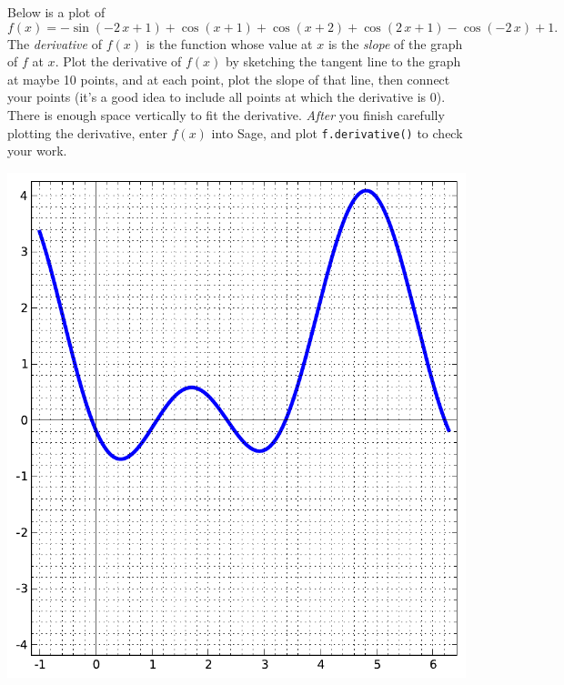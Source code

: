 Below is a plot of $$f(x)=-\sin\left(-2 \, x + 1\right) + \cos\left(x + 1\right) + \cos\left(x + 2\right) + \cos\left(2 \, x + 1\right) - \cos\left(-2 \, x\right) + 1.$$  The {\em \color{red}derivative} of $f(x)$ is the function whose value at $x$ is the {\em slope} of the graph of $f$ at $x$.  Plot the derivative of $f(x)$ by sketching the tangent line to the graph at maybe 10 points, and at each point, plot the slope of that line, then connect your points (it's a good idea to include all points at which the derivative is 0).  There is enough space vertically to fit the derivative.  {\em After} you finish carefully plotting the derivative, enter $f(x)$ into Sage, and plot {\color{blue}\verb|f.derivative()|} to check your work.
\begin{center}\includegraphics{functions/30.pdf}\end{center}\newpage

